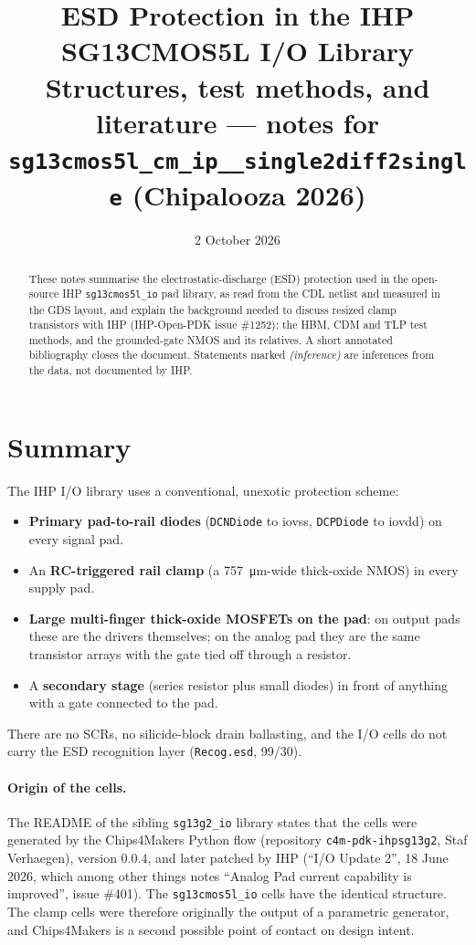 \documentclass[11pt,a4paper]{article}
\title{ESD Protection in the IHP SG13CMOS5L I/O Library\\[2pt]
  \large Structures, test methods, and literature --- notes for\\
  \texttt{sg13cmos5l\_cm\_ip\_\_single2diff2single} (Chipalooza 2026)}
\author{}
\date{2 October 2026}
\newcommand{\cell}[1]{\texttt{#1}}
\begin{document}
\maketitle

\begin{abstract}
\noindent
These notes summarise the electrostatic-discharge (ESD) protection used in the
open-source IHP \cell{sg13cmos5l\_io} pad library, as read from the CDL netlist
and measured in the GDS layout, and explain the background needed to discuss
resized clamp transistors with IHP (IHP-Open-PDK issue \#1252): the HBM, CDM and
TLP test methods, and the grounded-gate NMOS and its relatives. A short
annotated bibliography closes the document. Statements marked \emph{(inference)}
are inferences from the data, not documented by IHP.
\end{abstract}

\section{Summary}

The IHP I/O library uses a conventional, unexotic protection scheme:
\begin{itemize}
  \item \textbf{Primary pad-to-rail diodes} (\cell{DCNDiode} to iovss,
        \cell{DCPDiode} to iovdd) on every signal pad.
  \item An \textbf{RC-triggered rail clamp} (a \SI{757}{\micro\metre}-wide
        thick-oxide NMOS) in every supply pad.
  \item \textbf{Large multi-finger thick-oxide MOSFETs on the pad}: on output
        pads these are the drivers themselves; on the analog pad they are the
        same transistor arrays with the gate tied off through a resistor.
  \item A \textbf{secondary stage} (series resistor plus small diodes) in front
        of anything with a gate connected to the pad.
\end{itemize}
There are no SCRs, no silicide-block drain ballasting, and the I/O cells do not
carry the ESD recognition layer (\cell{Recog.esd}, 99/30).

\paragraph{Origin of the cells.}
The README of the sibling \cell{sg13g2\_io} library states that the cells were
generated by the Chips4Makers Python flow (repository
\cell{c4m-pdk-ihpsg13g2}, Staf Verhaegen), version 0.0.4, and later patched by
IHP (``I/O Update 2'', 18 June 2026, which among other things notes
``Analog Pad current capability is improved'', issue \#401). The
\cell{sg13cmos5l\_io} cells have the identical structure. The clamp cells
were therefore originally the output of a parametric generator, and Chips4Makers
is a second possible point of contact on design intent.
\end{document}

